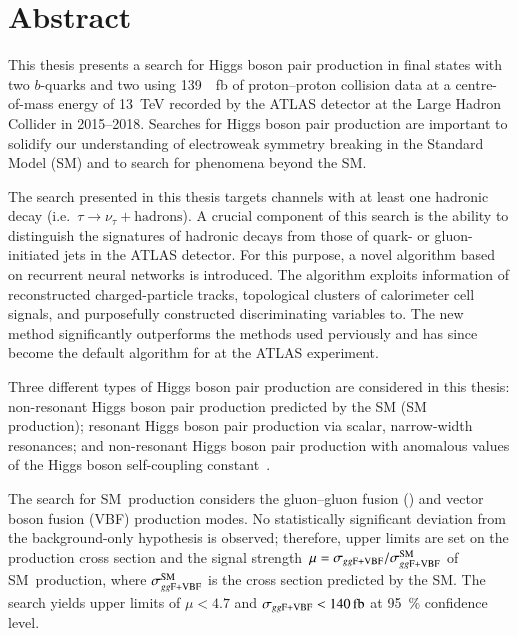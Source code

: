 \chapter*{Abstract}


This thesis presents a search for Higgs boson pair production in final states
with two $b$-quarks and two \tauleptons using \SI{139}{\per\femto\barn} of
proton--proton collision data at a centre-of-mass energy of \SI{13}{\TeV}
recorded by the ATLAS detector at the Large Hadron Collider in 2015--2018.
Searches for Higgs boson pair production are important to solidify our
understanding of electroweak symmetry breaking in the Standard Model (SM) and to
search for phenomena beyond the SM.

The search presented in this thesis targets channels with at least one hadronic
\taulepton decay (i.e.~$\tau \to \nu_{\tau} + \text{hadrons}$). A crucial
component of this search is the ability to distinguish the signatures of
hadronic \taulepton decays from those of quark- or gluon-initiated jets in the
ATLAS detector. For this purpose, a novel \tauid algorithm based on recurrent
neural networks is introduced. The algorithm exploits information of
reconstructed charged-particle tracks, topological clusters of calorimeter cell
signals, and purposefully constructed discriminating variables
to. The new \tauid method significantly outperforms the methods used
perviously and has since become the default algorithm for \tauid at the ATLAS
experiment.

Three different types of Higgs boson pair production are considered in this
thesis: non-resonant Higgs boson pair production predicted by the SM (SM~\HH
production); resonant Higgs boson pair production via scalar, narrow-width
resonances; and non-resonant Higgs boson pair production with anomalous values
of the Higgs boson self-coupling constant~\lambdahhh.

The search for SM~\HH production considers the gluon--gluon fusion (\ggF) and
vector boson fusion (VBF) production modes. No statistically significant
deviation from the background-only hypothesis is observed; therefore, upper
limits are set on the production cross section \xsecggfvbf and the signal
strength~$\mu = \sigma_{gg\text{F+VBF}} / \sigma_{gg\text{F+VBF}}^{\text{SM}}$ of SM~\HH production,
where $\sigma_{gg\text{F+VBF}}^{\text{SM}}$ is the cross section predicted by the SM. The
search yields upper limits of $\mu < \num{4.7}$ and
$\xsecggfvbf < \SI{140}{\femto\barn}$ at \SI{95}{\percent} confidence level.

